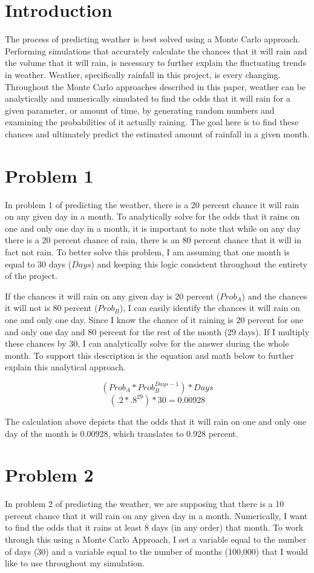 \documentclass[twocolumn]{revtex4}
\begin{document}
\section{Introduction}
	The process of predicting weather is best solved using a Monte Carlo approach. Performing simulations that accurately calculate the chances that it will rain and the volume that it will rain, is necessary to further explain the fluctuating trends in weather. Weather, specifically rainfall in this project, is every changing. Throughout the Monte Carlo approaches described in this paper, weather can be analytically and numerically simulated to find the odds that it will rain for a given parameter, or amount of time, by generating random numbers and examining the probabilities of it actually raining. The goal here is to find these chances and ultimately predict the estimated amount of rainfall in a given month. 

\section{Problem 1}
	In problem 1 of predicting the weather, there is a 20 percent chance it will rain on any given day in a month. To analytically solve for the odds that it rains on one and only one day in a month, it is important to note that while on any day there is a 20 percent chance of rain, there is an 80 percent chance that it will in fact not rain. To better solve this problem, I am assuming that one month is equal to 30 days ($Days$) and keeping this logic consistent throughout the entirety of the project. 
	
	If the chances it will rain on any given day is 20 percent ($Prob_A$) and the chances it will not is 80 percent ($Prob_B$), I can easily identify the chances it will rain on one and only one day. Since I know the chance of it raining is 20 percent for one and only one day and 80 percent for the rest of the month (29 days). If I multiply these chances by 30, I can analytically solve for the answer during the whole month. To support this description is the equation and math below to further explain this analytical approach. 

$$(Prob_A*Prob_B^{Days-1})*Days$$
$$(.2*.8^{29})*30 = 0.00928 $$

	The calculation above depicts that the odds that it will rain on one and only one day of the month is 0.00928, which translates to 0.928 percent. 
	

\section{Problem 2}
	 In problem 2 of predicting the weather, we are supposing that there is a 10 percent chance that it will rain on any given day in a month. Numerically, I want to find the odds that it rains at least 8 days (in any order) that month. To work through this using a Monte Carlo Approach, I set a variable equal to the number of days (30) and a variable equal to the number of months (100,000) that I would like to use throughout my simulation. 
	 
\end{document}
